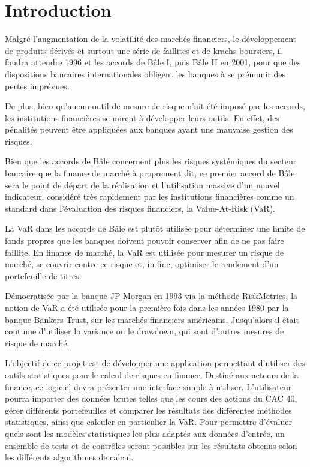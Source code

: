 \chapter{Introduction} 
	Malgré l’augmentation de la volatilité des marchés financiers, le développement de produits dérivés et surtout une série de faillites et de krachs boursiers, il faudra attendre 1996 et les accords de Bâle I, puis Bâle II en 2001, pour que des dispositions bancaires internationales obligent les banques à se prémunir des pertes imprévues. 

De plus, bien qu’aucun outil de mesure de risque n’ait été imposé par les accords, les institutions financières se mirent à développer leurs outils. En effet, des pénalités peuvent être appliquées aux banques ayant une mauvaise gestion des risques.

Bien que les accords de Bâle concernent plus les risques systémiques du secteur bancaire que la finance de marché à proprement dit, ce premier accord de Bâle sera le point de départ de la réalisation et l’utilisation massive d’un nouvel indicateur, considéré très rapidement par les institutions financières comme un standard dans l’évaluation des risques financiers, la Value-At-Risk (VaR).

La VaR dans les accords de Bâle est plutôt utilisée pour déterminer une limite de fonds propres que les banques doivent pouvoir conserver afin de ne pas faire faillite. En finance de marché, la VaR est utilisée pour mesurer un risque de marché, se couvrir contre ce risque et, in fine, optimiser le rendement d'un portefeuille de titres.

Démocratisée par la banque JP Morgan en 1993 via la méthode RiskMetrics, la notion de VaR a été utilisée pour la première fois dans les années 1980 par la banque Bankers Trust, sur les marchés financiers américains. Jusqu'alors il était coutume d'utiliser la variance ou le drawdown, qui sont d'autres mesures de risque de marché.

L’objectif de ce projet est de développer une application permettant d’utiliser des outils statistiques pour le calcul de risques en finance. Destiné aux acteurs de la finance, ce logiciel devra présenter une interface simple à utiliser. L’utilisateur pourra importer des données brutes telles que les cours des actions du CAC 40, gérer différents portefeuilles et comparer les résultats des différentes méthodes statistiques, ainsi que calculer en particulier la VaR. Pour permettre d’évaluer quels sont les modèles statistiques les plus adaptés aux données d’entrée, un ensemble de tests et de contrôles seront possibles sur les résultats obtenus selon les différents algorithmes de calcul.

